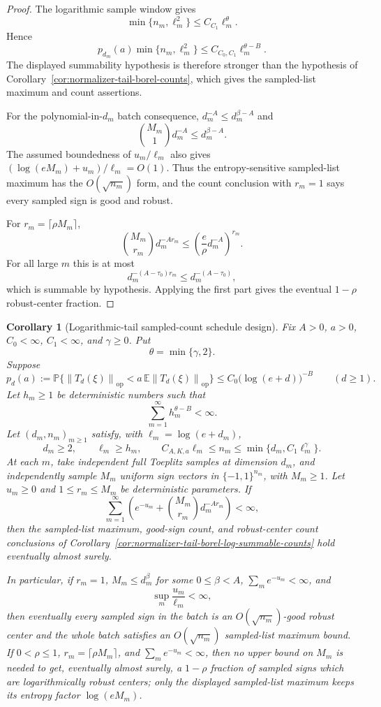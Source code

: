\documentclass[11pt]{amsart}
\numberwithin{equation}{section}
\newtheorem{corollary}[theorem]{Corollary}
\theoremstyle{definition}
\theoremstyle{remark}
\newcommand{\op}{\mathrm{op}}
\newcommand{\Prob}{\mathbb P}
\newcommand{\Exp}{\mathbb E}
\newcommand{\norm}[1]{\left\lVert #1\right\rVert}
\begin{document}
\begin{proof}
The logarithmic sample window gives
\[
  \min\{n_m,\ell_m^2\}\le C_{C_1}\ell_m^\theta .
\]
Hence
\[
  p_{d_m}(a)\min\{n_m,\ell_m^2\}
  \le C_{C_0,C_1}\ell_m^{\theta-B}.
\]
The displayed summability hypothesis is therefore stronger than the hypothesis
of Corollary~\ref{cor:normalizer-tail-borel-counts}, which gives the sampled-list
maximum and count assertions.

For the polynomial-in-\(d_m\) batch consequence, \(d_m^{-A}\le d_m^{\beta-A}\)
and
\[
  \binom{M_m}{1}d_m^{-A}\le d_m^{\beta-A}.
\]
The assumed boundedness of \(u_m/\ell_m\) also gives
\((\log(eM_m)+u_m)/\ell_m=O(1)\).  Thus the entropy-sensitive sampled-list
maximum has the \(O(\sqrt{n_m})\) form, and the count conclusion with \(r_m=1\)
says every sampled sign is good and robust.

For \(r_m=\lceil\rho M_m\rceil\),
\[
  \binom{M_m}{r_m}d_m^{-A r_m}
  \le
  \left(\frac{e}{\rho}d_m^{-A}\right)^{r_m}.
\]
For all large \(m\) this is at most
\[
  d_m^{-(A-\tau_0)r_m}\le d_m^{-(A-\tau_0)},
\]
which is summable by hypothesis.  Applying the first part gives the eventual
\(1-\rho\) robust-center fraction.
\end{proof}

\begin{corollary}[Logarithmic-tail sampled-count schedule design]
\label{cor:normalizer-tail-borel-log-schedule-counts}
Fix \(A>0\), \(a>0\), \(C_0<\infty\), \(C_1<\infty\), and \(\gamma\ge0\).  Put
\[
  \theta=\min\{\gamma,2\}.
\]
Suppose
\[
  p_d(a):=\Prob\{\norm{T_d(\xi)}_{\op}<a\,\Exp\norm{T_d(\xi)}_{\op}\}
  \le C_0\bigl(\log(e+d)\bigr)^{-B}
  \qquad(d\ge1).
\]
Let \(h_m\ge1\) be deterministic numbers such that
\[
  \sum_{m=1}^\infty h_m^{\theta-B}<\infty .
\]
Let \((d_m,n_m)_{m\ge1}\) satisfy, with \(\ell_m=\log(e+d_m)\),
\[
  d_m\ge2,\qquad \ell_m\ge h_m,\qquad
  C_{A,K,a}\ell_m\le n_m\le \min\{d_m,C_1\ell_m^\gamma\}.
\]
At each \(m\), take independent full Toeplitz samples at dimension \(d_m\), and
independently sample \(M_m\) uniform sign vectors in \(\{-1,1\}^{n_m}\), with
\(M_m\ge1\).  Let \(u_m\ge0\) and \(1\le r_m\le M_m\) be deterministic
parameters.  If
\[
  \sum_{m=1}^{\infty}
  \left(e^{-u_m}+\binom{M_m}{r_m}d_m^{-A r_m}\right)<\infty,
\]
then the sampled-list maximum, good-sign count, and robust-center count
conclusions of Corollary~\ref{cor:normalizer-tail-borel-log-summable-counts}
hold eventually almost surely.

In particular, if \(r_m=1\), \(M_m\le d_m^\beta\) for some \(0\le\beta<A\),
\(\sum_m e^{-u_m}<\infty\), and
\[
  \sup_m\frac{u_m}{\ell_m}<\infty,
\]
then eventually every sampled sign in the batch is an \(O(\sqrt{n_m})\)-good
robust center and the whole batch satisfies an \(O(\sqrt{n_m})\) sampled-list
maximum bound.  If \(0<\rho\le1\), \(r_m=\lceil\rho M_m\rceil\), and
\(\sum_m e^{-u_m}<\infty\), then no upper bound on \(M_m\) is needed to get,
eventually almost surely, a \(1-\rho\) fraction of sampled signs which are
logarithmically robust centers; only the displayed sampled-list maximum keeps
its entropy factor \(\log(eM_m)\).
\end{corollary}
\end{document}
